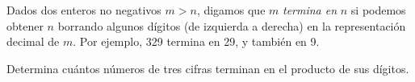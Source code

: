 Dados dos enteros no negativos $m>n$, digamos que $m$ {\itshape termina en} $n$ si podemos obtener $n$ borrando algunos dígitos (de izquierda a derecha) en la representación decimal de $m$. Por ejemplo, 329 termina en 29, y también en 9.

Determina cuántos números de tres cifras terminan en el producto de sus dígitos.
